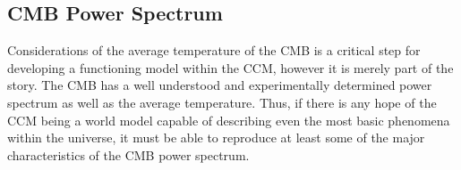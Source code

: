 \documentclass[a4paper]{article}
\begin{document}






    \subsection{CMB Power Spectrum}
    Considerations of the average temperature of the CMB is a critical step for
    developing a functioning model within the CCM, however it is
    merely part of the story. The CMB has a well understood and experimentally
    determined power spectrum as well as the average temperature. Thus, if
    there is any hope of the CCM being a world model capable of describing even
    the most basic phenomena within the universe, it must be able to reproduce
    at least some of the major characteristics of the CMB power spectrum.
\end{document}
